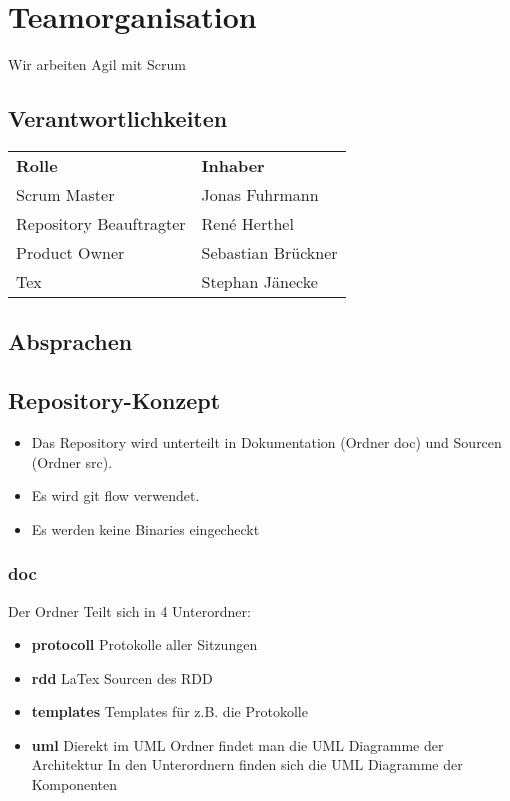\chapter{Teamorganisation}

Wir arbeiten Agil mit Scrum

\section{Verantwortlichkeiten}

\begin{tabular}{ll}
  \textbf{Rolle} & \textbf{Inhaber}\\
   Scrum Master & Jonas Fuhrmann\\
   Repository Beauftragter & René Herthel\\
   Product Owner & Sebastian Brückner\\
   Tex & Stephan Jänecke
 \end{tabular}

\section{Absprachen}


\section{Repository-Konzept}

\begin{itemize}
	\item Das Repository wird unterteilt in Dokumentation (Ordner doc) und Sourcen (Ordner src).
	\item Es wird git flow verwendet.
	\item Es werden keine Binaries eingecheckt
\end{itemize}

\subsection{doc}
Der Ordner Teilt sich in 4 Unterordner:
\begin{itemize}
	\item \textbf{protocoll} Protokolle aller Sitzungen
	\item \textbf{rdd}  LaTex Sourcen des RDD
	\item \textbf{templates} Templates für z.B. die Protokolle
	\item \textbf{uml} Dierekt im UML Ordner findet man die UML Diagramme der Architektur
	In den Unterordnern finden sich die UML Diagramme der Komponenten
\end{itemize}


	
